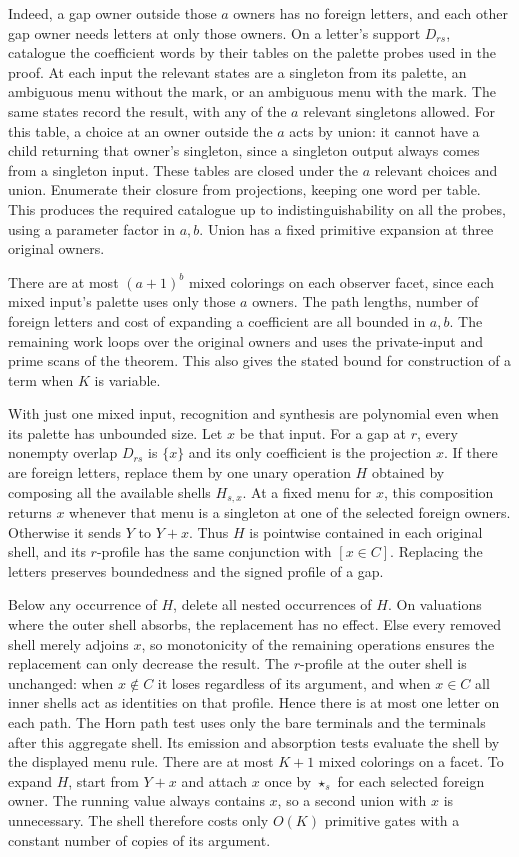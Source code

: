 Indeed, a gap owner outside those $a$ owners has no
foreign letters, and each other gap owner needs letters
at only those owners. On a letter's support $D_{rs}$,
catalogue the coefficient words by their tables on
the palette probes used in the proof. At each input
the relevant states are a singleton from its palette,
an ambiguous menu without the mark, or an ambiguous
menu with the mark. The same states record the result,
with any of the $a$ relevant singletons allowed.
For this table, a choice at an owner outside the $a$
acts by union: it cannot have a child returning that
owner's singleton, since a singleton output always
comes from a singleton input. These tables are closed
under the $a$ relevant choices and union. Enumerate
their closure from projections, keeping one word per
table. This produces the required catalogue up to
indistinguishability on all the probes, using a
parameter factor in $a,b$. Union has a fixed primitive
expansion at three original owners.

There are at most $(a+1)^b$ mixed colorings on each
observer facet, since each mixed input's palette uses
only those $a$ owners. The path lengths, number of
foreign letters and cost of expanding a coefficient
are all bounded in $a,b$. The remaining work loops
over the original owners and uses the private-input and
prime scans of the theorem. This also gives the stated
bound for construction of a term when $K$ is variable.

With just one mixed input, recognition and synthesis
are polynomial even when its palette has unbounded size.
Let $x$ be that input. For a gap at $r$, every nonempty
overlap $D_{rs}$ is $\{x\}$ and its only coefficient is
the projection $x$. If there are foreign letters, replace
them by one unary operation $H$ obtained by composing
all the available shells $H_{s,x}$. At a fixed menu for
$x$, this composition returns $x$ whenever that menu
is a singleton at one of the selected foreign owners.
Otherwise it sends $Y$ to $Y+x$. Thus $H$ is pointwise
contained in each original shell, and its $r$-profile
has the same conjunction with $[x\in C]$.
Replacing the letters preserves boundedness and the
signed profile of a gap.

Below any occurrence of $H$, delete all nested occurrences
of $H$. On valuations where the outer shell absorbs,
the replacement has no effect. Else every removed shell
merely adjoins $x$, so monotonicity of the remaining
operations ensures the replacement can only decrease
the result. The $r$-profile at the outer shell is
unchanged: when $x\notin C$ it loses regardless of its
argument, and when $x\in C$ all inner shells act as
identities on that profile. Hence there is at most one
letter on each path. The Horn path test uses only the
bare terminals and the terminals after this aggregate
shell. Its emission and absorption tests evaluate the
shell by the displayed menu rule. There are at most
$K+1$ mixed colorings on a facet. To expand $H$, start
from $Y+x$ and attach $x$ once by $\star_s$ for each
selected foreign owner. The running value always
contains $x$, so a second union with $x$ is unnecessary.
The shell therefore costs only $O(K)$ primitive gates
with a constant number of copies of its argument.

